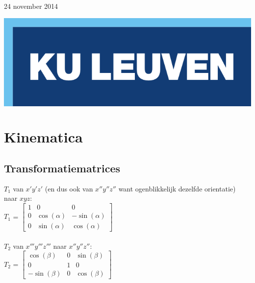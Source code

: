 \documentclass[a4paper,10pt]{article}
\begin{document}
\begin{titlepage}

{\large 24 november 2014}\\[3cm] %

\begin{center}
 \includegraphics{Logo.png}\\[1cm] %
\end{center}

\vfill %

\end{titlepage}
\pagestyle{fancy}
\fancyhf{}
\fancyfoot[R]{\thepage}
\tableofcontents
\section{Kinematica}
\subsection{Transformatiematrices}
$T_{1}$ van $x'y'z'$ (en dus ook van $x''y''z''$ want ogenblikkelijk dezelfde orientatie) naar $xyz$:\\
$T_{1}$ =
$\begin{bmatrix}
	1 & 0 & 0 \\
	0 & \cos(\alpha) & -\sin(\alpha) \\
	0 & \sin(\alpha) & \cos(\alpha)
\end{bmatrix}$\\\\
$T_{2}$ van $x'''y'''z'''$ naar $x''y''z''$: \\
$T_{2}$ =
$\begin{bmatrix}
	\cos(\beta) & 0 & \sin(\beta) \\
	0 & 1 & 0 \\
	-\sin(\beta) & 0 & \cos(\beta)
\end{bmatrix}$
\end{document}
